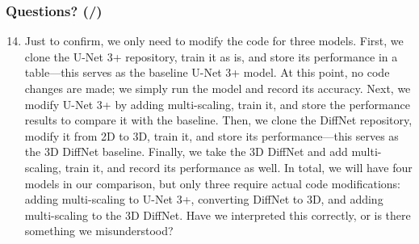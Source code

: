 \documentclass[t,24pt]{beamer}
\newcounter{currentQSlide}
\newcounter{totalQSlide}
\newcommand{\incrementQSlideCnt}{%
    \stepcounter{currentQSlide}
}
\begin{document}
\begin{frame}[hoved]
\incrementQSlideCnt
\frametitle{Questions? (\thecurrentQSlide/\thetotalQSlide)}
\begin{enumerate}
\setcounter{enumi}{13}
\item \small Just to confirm, we only need to modify the code for three models. First, we clone the U-Net 3+ repository, train it as is, and store its performance in a table—this serves as the baseline U-Net 3+ model. At this point, no code changes are made; we simply run the model and record its accuracy. Next, we modify U-Net 3+ by adding multi-scaling, train it, and store the performance results to compare it with the baseline. Then, we clone the DiffNet repository, modify it from 2D to 3D, train it, and store its performance—this serves as the 3D DiffNet baseline. Finally, we take the 3D DiffNet and add multi-scaling, train it, and record its performance as well. In total, we will have four models in our comparison, but only three require actual code modifications: adding multi-scaling to U-Net 3+, converting DiffNet to 3D, and adding multi-scaling to the 3D DiffNet. Have we interpreted this correctly, or is there something we misunderstood?

\end{enumerate}
\end{frame}
\end{document}
